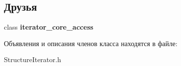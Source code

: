 \subsection*{Друзья}
\begin{DoxyCompactItemize}
\item 
\mbox{\label{class_s_p_u___g_r_a_p_h_1_1_structure_iterator_a0975271623c74c5b89bdf8d7fbce69c4}} 
class {\bfseries iterator\+\_\+core\+\_\+access}
\end{DoxyCompactItemize}


Объявления и описания членов класса находятся в файле\+:\begin{DoxyCompactItemize}
\item 
Structure\+Iterator.\+h\end{DoxyCompactItemize}

